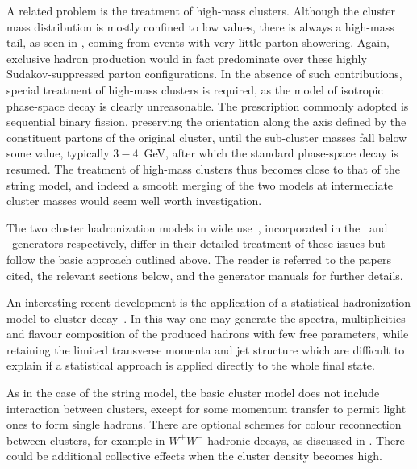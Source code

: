  A related problem is the treatment of
high-mass clusters.  Although the cluster mass distribution is
mostly confined to low values, there is always a high-mass tail, as
seen in , coming from events with very little
parton showering.   Again, exclusive hadron production
would in fact predominate over these highly Sudakov-suppressed
parton configurations.  In the absence of such contributions, special
treatment of high-mass clusters is required, as  the model of
isotropic phase-space decay is clearly unreasonable.  The prescription
commonly adopted is sequential binary fission, preserving the
orientation along the axis defined by the constituent partons of the
original cluster, until the sub-cluster masses fall below some value,
typically  $3-4$~GeV, after which the standard phase-space decay is
resumed.  The treatment of high-mass clusters thus becomes close to
that of the string model, and indeed a smooth merging of the two
models at intermediate cluster masses would seem well worth investigation. 

The two cluster hadronization models in wide
use~\cite{Webber:1983if,Winter:2003tt},
incorporated in the \Herwig\ and \Sherpa\ generators respectively, differ in
their detailed treatment of these issues but follow the basic approach
outlined above.  The reader is referred to the papers cited, the relevant sections
below, and the generator manuals for further details.

An interesting recent development is the application of a statistical
hadronization model to cluster decay~\cite{Bignamini:2010jy}.  In this
way one may generate the spectra, multiplicities and flavour
composition of the produced hadrons with few free parameters, while
retaining the limited transverse momenta and jet structure which are
difficult to explain if a statistical approach is applied directly to the whole
final state.

As in the case of the string model, the basic cluster model does
not include interaction between clusters, except for some
momentum transfer to permit light ones to form single hadrons.
There are optional schemes for colour reconnection between clusters,
for example in $W^+W^-$ hadronic decays, as discussed in
.  There could be additional collective effects
when the cluster density becomes high.

